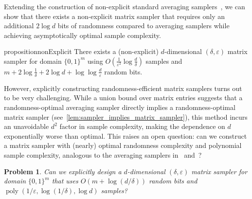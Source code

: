 \documentclass[11pt,letterpaper]{article}
\newtheorem{problem}{Problem}
\DeclareMathOperator*{\poly}{poly}
\newcommand{\eps}{\varepsilon}
\newcommand{\1}{\mathbbm{1}}
\newcommand{\zo}{\{0, 1\}}
\begin{document}

Extending the construction of non-explicit standard averaging samplers~\cite{CEG95}, we can show that there exists a non-explicit matrix sampler that requires only an additional $2 \log d$ bits of randomness compared to averaging samplers while achieving asymptotically optimal sample complexity.
\begin{restatable}{proposition}{nonExplicit}
    \label{prop:non_explicit}
    There exists a (non-explicit) $d$-dimensional $(\delta, \eps)$ matrix sampler for domain $\zo^m$ using $O(\frac{1}{\eps^2}\log\frac{d}{\delta})$ samples and $m + 2\log\frac{1}{\delta} + 2 \log d + \log \log \frac{d}{\eps}$ random bits.
\end{restatable}
However, explicitly constructing randomness-efficient matrix samplers turns out to be very challenging. While a union bound over matrix entries suggests that a randomness-optimal averaging sampler directly implies a randomness-optimal matrix sampler (see~\cref{lem:sampler_implies_matrix_sampler}), this method incurs an unavoidable $d^2$ factor in sample complexity, making the dependence on $d$ exponentially worse than optimal.
This raises an open question: can we construct a matrix sampler with (nearly) optimal randomness complexity and polynomial sample complexity, analogous to the averaging samplers in~\cite{bellare1994randomness} and~\cite{zuckerman1997randomness}? 

\begin{problem}
    \label{problem2}
    Can we explicitly design a $d$-dimensional $(\delta, \eps)$ matrix sampler for domain $\zo^m$ that uses $O(m + \log(d / \delta))$ random bits and $\poly(1/\eps, \log(1 / \delta), \log d)$ samples?
\end{problem}
\end{document}
